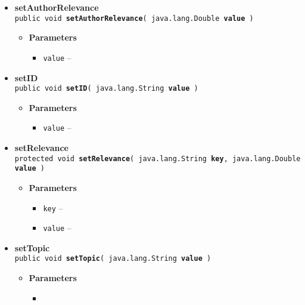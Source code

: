 {{{\begin{itemize}
{}%
 \item{ 
{\bf setAuthorRelevance}\\
{\tt public void\ {\bf setAuthorRelevance}( {\tt java.lang.Double} {\bf value} )
\label{amber.common.Analysis.setAuthorRelevance(java.lang.Double)}}%
\begin{itemize}
\item{
{\bf Parameters}
  \begin{itemize}
   \item{
{\tt value} -- }
  \end{itemize}
}%
\end{itemize}
}%
 \item{ 
{\bf setID}\\
{\tt public void\ {\bf setID}( {\tt java.lang.String} {\bf value} )
\label{amber.common.Analysis.setID(java.lang.String)}}%
\begin{itemize}
\item{
{\bf Parameters}
  \begin{itemize}
   \item{
{\tt value} -- }
  \end{itemize}
}%
\end{itemize}
}%
 \item{ 
{\bf setRelevance}\\
{\tt protected void\ {\bf setRelevance}( {\tt java.lang.String} {\bf key},
{\tt java.lang.Double} {\bf value} )
\label{amber.common.Analysis.setRelevance(java.lang.String, java.lang.Double)}}%
\begin{itemize}
\item{
{\bf Parameters}
  \begin{itemize}
   \item{
{\tt key} -- }
   \item{
{\tt value} -- }
  \end{itemize}
}%
\end{itemize}
}%
 \item{ 
{\bf setTopic}\\
{\tt public void\ {\bf setTopic}( {\tt java.lang.String} {\bf value} )
\label{amber.common.Analysis.setTopic(java.lang.String)}}%
\begin{itemize}
\item{
{\bf Parameters}
  \begin{itemize}
   \item{
}
\end{itemize}}
\end{itemize}}
\end{itemize}}}}
